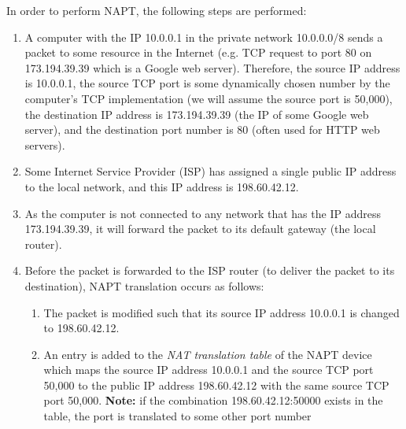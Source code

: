 \documentclass[pdftex,12pt,a4paper]{article}
\begin{document}
                In order to perform NAPT, the following steps are performed:
                \begin{enumerate}
                    \item A computer with the IP 10.0.0.1 in the private
                        network 10.0.0.0/8 sends a packet to
                        some resource in the Internet (e.g. TCP request to port
                        80 on 173.194.39.39 which is a Google web server).
                        Therefore, the source IP address is 10.0.0.1, the source TCP
                        port is some dynamically chosen number by the
                        computer's TCP implementation (we will assume the
                        source port is 50,000), the destination IP
                        address is 173.194.39.39 (the IP of some Google web
                        server), and the destination port number is 80 (often
                        used for HTTP web servers).
                    \item Some Internet Service Provider (ISP) has assigned a
                        single public IP address to the local network, and this
                        IP address is 198.60.42.12.
                    \item As the computer is not connected to any network that
                        has the IP address 173.194.39.39, it will forward the
                        packet to its default gateway (the local router).
                    \item Before the packet is forwarded to the ISP router (to
                        deliver the packet to its destination), NAPT
                        translation occurs as follows:
                        \begin{enumerate}
                            \item The packet is modified such that its source IP address 10.0.0.1 is changed to
                                198.60.42.12.
                            \item An entry is added to the \emph{NAT
                                translation table} of the NAPT device
                                which maps the source IP address 10.0.0.1 and
                                the source TCP port 50,000 to the public IP
                                address 198.60.42.12 with the same source TCP
                                port 50,000. \textbf{Note:} if the combination
                                198.60.42.12:50000 exists in the table, the
                                port is translated to some other port number

\end{enumerate}
\end{enumerate}
\end{document}
